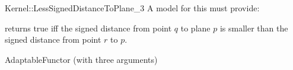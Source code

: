 \begin{ccRefFunctionObjectConcept}{Kernel::LessSignedDistanceToPlane_3}
A model for this must provide:


{returns true iff the signed distance from point $q$ to plane $p$ is
smaller than the signed distance from point $r$ to $p$.}

\ccRefines
AdaptableFunctor (with three arguments)

\ccSeeAlso
{}\\

\end{ccRefFunctionObjectConcept}
